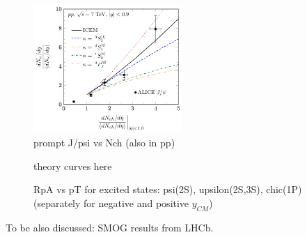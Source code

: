 \documentclass[../report.tex]{subfiles}
\begin{document}
\begin{figure}
 \begin{center}
  \includegraphics[width=0.5\textwidth]{fig/theory/cgc_jpsi_nch.png}
 \end{center}

 \caption{prompt J/psi vs Nch (also in pp)~\cite{Ma:2018bax}}
\end{figure}

\begin{figure}
 \begin{center}
 theory curves here
 \end{center}

 \caption{RpA vs pT for excited states: psi(2S), upsilon(2S,3S), chic(1P) (separately for negative and positive $y_{CM}$)}
\end{figure}

To be also discussed: SMOG results from LHCb.





\end{document}
